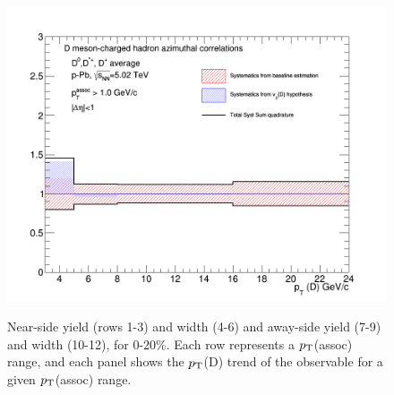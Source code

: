 \begin{figure}
{\includegraphics[width=0.32\linewidth]{figuresVsCent/Averages/020/TotalSystematicSourcesASSigma_pthad1to99.png}} \\
 \caption{Near-side yield (rows 1-3) and width (4-6) and away-side yield (7-9) and width (10-12), for 0-20\%. Each row represents a $p_{\rm T}$(assoc) range, and each panel shows the $p_{\rm T}$(D) trend of the observable for a given $p_{\rm T}$(assoc) range.}
\label{fig:syst020}
\end{figure}

